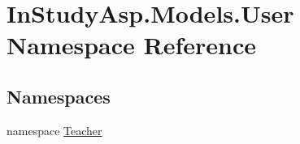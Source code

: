 \hypertarget{namespace_in_study_asp_1_1_models_1_1_user}{}\section{In\+Study\+Asp.\+Models.\+User Namespace Reference}
\label{namespace_in_study_asp_1_1_models_1_1_user}
\subsection*{Namespaces}
\begin{DoxyCompactItemize}
\item 
namespace \hyperlink{namespace_in_study_asp_1_1_models_1_1_user_1_1_teacher}{Teacher}
\end{DoxyCompactItemize}
